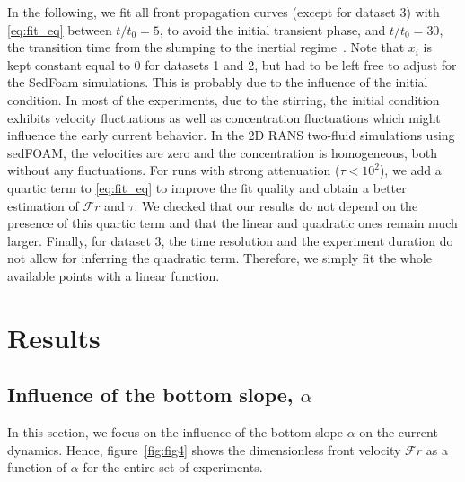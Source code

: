 \documentclass[12pt]{article}
\begin{document}
In the following, we fit all front propagation curves (except for dataset 3) with \eqref{eq:fit_eq} between $t/t_{0} = 5$, to avoid the initial transient phase, and $t/t_{0} = 30$, the transition time from the slumping to the inertial regime~\citep[similar to $X_{\text{t}}/L_{0}\approx 10$ as mentioned in section \ref{sec:intro_lockrelease}; see also e.g.][]{Rottman1983, Sher2015, Ottolenghi2016}. Note that $x_{i}$ is kept constant equal to 0 for datasets 1 and 2, but had to be left free to adjust for the SedFoam simulations. This is probably due to the influence of the initial condition. In most of the experiments, due to the stirring, the initial condition exhibits velocity fluctuations as well as concentration fluctuations which might influence the early current behavior. In the 2D RANS two-fluid simulations using sedFOAM, the velocities are zero and the concentration is homogeneous, both without any fluctuations. For runs with strong attenuation ($\tau < 10^{2}$), we add a quartic term to \eqref{eq:fit_eq} to improve the fit quality and obtain a better estimation of $\mathcal{F}r$ and $\tau$. We checked that our results do not depend on the presence of this quartic term and that the linear and quadratic ones remain much larger. Finally, for dataset 3, the time resolution and the experiment duration do not allow for inferring the quadratic term. Therefore, we simply fit the whole available points with a linear function.

\section{Results}
\label{sec:results}

\subsection{Influence of the bottom slope, $\alpha$}
\label{sec:influence_slope}

In this section, we focus on the influence of the bottom slope $\alpha$ on the current dynamics. Hence, figure~\ref{fig:fig4} shows the dimensionless front velocity $\mathcal{F}r$ as a function of $\alpha$ for the entire set of experiments.
\end{document}
